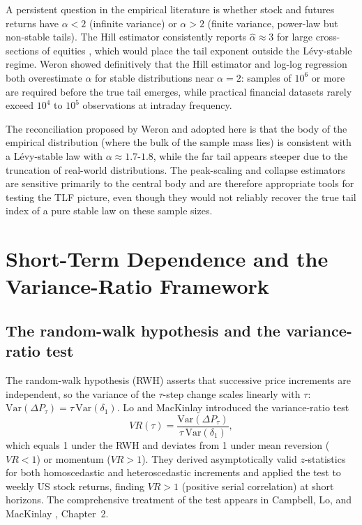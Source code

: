 \documentclass[12pt,a4paper]{article}
\begin{document}
A persistent question in the empirical literature is whether stock and futures
returns have $\alpha < 2$ (infinite variance) or $\alpha > 2$ (finite variance,
power-law but non-stable tails). The Hill estimator consistently reports
$\hat\alpha \approx 3$ for large cross-sections of equities
\cite{Gopikrishnan1999}, which would place the tail exponent outside the
Lévy-stable regime. Weron \cite{Weron2001} showed definitively that the Hill
estimator and log-log regression both overestimate $\alpha$ for stable
distributions near $\alpha = 2$: samples of $10^6$ or more are required before
the true tail emerges, while practical financial datasets rarely exceed $10^4$
to $10^5$ observations at intraday frequency.

The reconciliation proposed by Weron \cite{Weron2001} and adopted here is that
the body of the empirical distribution (where the bulk of the sample mass lies)
is consistent with a Lévy-stable law with $\alpha \approx 1.7$-$1.8$, while
the far tail appears steeper due to the truncation of real-world distributions.
The peak-scaling and collapse estimators are sensitive primarily to the central
body and are therefore appropriate tools for testing the TLF picture, even
though they would not reliably recover the true tail index of a pure stable law
on these sample sizes.


\section{Short-Term Dependence and the Variance-Ratio Framework}
\label{sec:vr}

\subsection{The random-walk hypothesis and the variance-ratio test}

The random-walk hypothesis (RWH) asserts that successive price increments are
independent, so the variance of the $\tau$-step change scales linearly with
$\tau$: $\mathrm{Var}(\Delta P_\tau) = \tau\,\mathrm{Var}(\delta_1)$.
Lo and MacKinlay \cite{LoMacKinlay1988} introduced the variance-ratio test
\begin{equation}
  VR(\tau) = \frac{\mathrm{Var}(\Delta P_\tau)}{\tau\,\mathrm{Var}(\delta_1)},
  \label{eq:vr}
\end{equation}
which equals 1 under the RWH and deviates from 1 under mean reversion
($VR < 1$) or momentum ($VR > 1$). They derived asymptotically valid
$z$-statistics for both homoscedastic and heteroscedastic increments and
applied the test to weekly US stock returns, finding $VR > 1$ (positive serial
correlation) at short horizons. The comprehensive treatment of the test
appears in Campbell, Lo, and MacKinlay \cite{CampbellLoMacKinlay1997}, Chapter~2.
\end{document}
